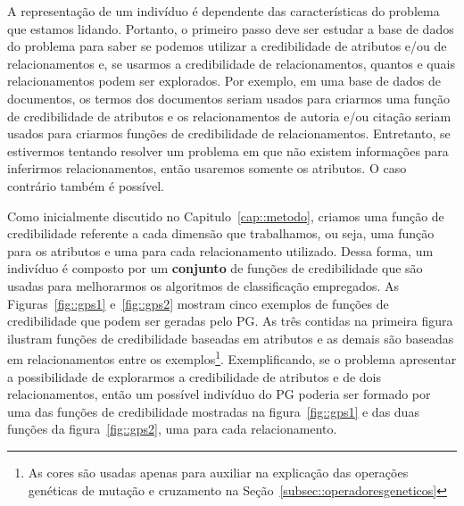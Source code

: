 A representação de um indivíduo é dependente das características do problema que estamos lidando. 
Portanto, o primeiro passo deve ser estudar a base de dados do problema para saber se podemos utilizar a credibilidade de atributos e/ou de relacionamentos e, se usarmos a credibilidade de relacionamentos, quantos e quais relacionamentos podem ser explorados.
Por exemplo, em uma base de dados de documentos, os termos dos documentos seriam usados para criarmos uma função de credibilidade de atributos e os relacionamentos de autoria e/ou citação seriam usados para criarmos funções de credibilidade de relacionamentos. Entretanto, se estivermos tentando resolver um problema em que não existem informações para inferirmos relacionamentos, então usaremos somente os atributos. O caso contrário também é possível.

Como inicialmente discutido no Capitulo~\ref{cap::metodo}, criamos uma função de credibilidade referente a cada dimensão que trabalhamos, ou seja, uma função para os atributos e uma para cada relacionamento utilizado. Dessa forma, um indivíduo é composto por um \textbf{conjunto} de funções de credibilidade que são usadas para melhorarmos os algoritmos de classificação empregados.
As Figuras~\ref{fig::gps1} e~\ref{fig::gps2} mostram cinco exemplos de funções de credibilidade que podem ser geradas pelo \textsc{PG}. As três contidas na primeira figura ilustram funções de credibilidade baseadas em atributos e as demais são baseadas em relacionamentos entre os exemplos\footnote{As cores são usadas apenas para auxiliar na explicação das operações genéticas de mutação e cruzamento na Seção~\ref{subsec::operadoresgeneticos}}.
Exemplificando, se o problema apresentar a possibilidade de explorarmos a credibilidade de atributos e de dois relacionamentos, então um possível indivíduo do \textsc{PG} poderia ser formado por uma das funções de credibilidade mostradas na figura~\ref{fig::gps1} e das duas funções da figura~\ref{fig::gps2}, uma para cada relacionamento.


